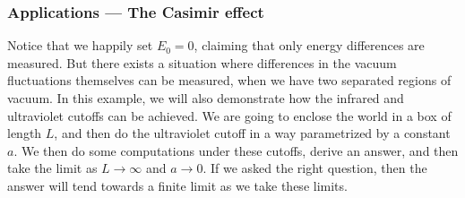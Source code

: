 \documentclass[a4paper]{article}
\begin{document}

\subsubsection*{Applications --- The Casimir effect}
Notice that we happily set $E_0 = 0$, claiming that only energy differences are measured. But there exists a situation where differences in the vacuum fluctuations themselves can be measured, when we have two separated regions of vacuum. In this example, we will also demonstrate how the infrared and ultraviolet cutoffs can be achieved. We are going to enclose the world in a box of length $L$, and then do the ultraviolet cutoff in a way parametrized by a constant $a$. We then do some computations under these cutoffs, derive an answer, and then take the limit as $L \to \infty$ and $a \to 0$. If we asked the right question, then the answer will tend towards a finite limit as we take these limits.
\end{document}
